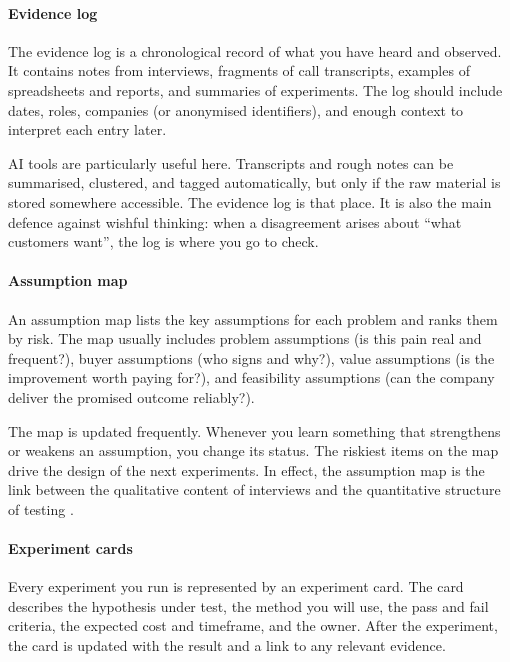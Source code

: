 \documentclass[10pt, a4paper, twocolumn]{article} %
\begin{document}
\paragraph{Evidence log}

The evidence log is a chronological record of what you have heard and observed. It contains notes from interviews, fragments of call transcripts, examples of spreadsheets and reports, and summaries of experiments. The log should include dates, roles, companies (or anonymised identifiers), and enough context to interpret each entry later.

AI tools are particularly useful here. Transcripts and rough notes can be summarised, clustered, and tagged automatically, but only if the raw material is stored somewhere accessible. The evidence log is that place. It is also the main defence against wishful thinking: when a disagreement arises about “what customers want”, the log is where you go to check.

\paragraph{Assumption map}

An assumption map lists the key assumptions for each problem and ranks them by risk. The map usually includes problem assumptions (is this pain real and frequent?), buyer assumptions (who signs and why?), value assumptions (is the improvement worth paying for?), and feasibility assumptions (can the company deliver the promised outcome reliably?).

The map is updated frequently. Whenever you learn something that strengthens or weakens an assumption, you change its status. The riskiest items on the map drive the design of the next experiments. In effect, the assumption map is the link between the qualitative content of interviews and the quantitative structure of testing \citep{ries2011lean,bland2019testing}.

\paragraph{Experiment cards}

Every experiment you run is represented by an experiment card. The card describes the hypothesis under test, the method you will use, the pass and fail criteria, the expected cost and timeframe, and the owner. After the experiment, the card is updated with the result and a link to any relevant evidence.
\end{document}
